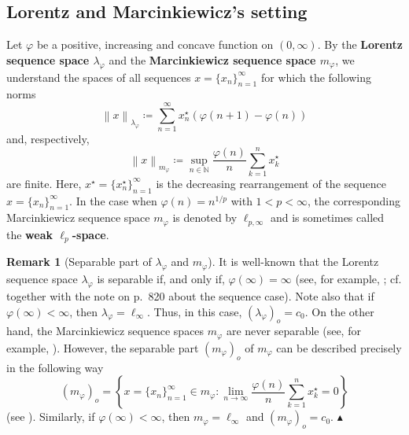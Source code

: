 \documentclass[11pt]{amsart}
\theoremstyle{definition}
\theoremstyle{definition}
\theoremstyle{definition}
\theoremstyle{definition}
\theoremstyle{definition}
\theoremstyle{definition}
\newtheorem{remark}[theorem]{Remark}
\theoremstyle{definition}
\theoremstyle{definition}
\numberwithin{equation}{section}
\numberwithin{equation}{section}
\numberwithin{equation}{section}
\theoremstyle{definition}
\theoremstyle{definition}
\theoremstyle{definition}
\theoremstyle{definition}
\theoremstyle{definition}
\theoremstyle{definition}
\newcommand{\norm}[1]{\left\lVert#1\right\rVert}
\newcommand\xqed[1]{%
	\leavevmode\unskip\penalty9999 \hbox{}\nobreak\hfill
	\quad\hbox{#1}}
\newcommand\demo{\xqed{{\Large $\blacktriangle$}}}
\begin{document}
\subsection{Lorentz and Marcinkiewicz's setting}
	Let $\varphi$ be a positive, increasing and concave function on $(0,\infty)$.
	By the {\bf Lorentz sequence space $\lambda_{\varphi}$} and the {\bf Marcinkiewicz sequence space $m_{\varphi}$},
	we understand the spaces of all sequences $x = \{x_n\}_{n=1}^{\infty}$ for which the following norms
	\begin{equation*}
		\norm{x}_{\lambda_{\varphi}} \coloneqq \sum_{n=1}^{\infty} x_n^{\star} (\varphi(n+1) - \varphi(n))
	\end{equation*}
	and, respectively,
	\begin{equation*}
		\norm{x}_{m_{\varphi}} \coloneqq \sup\limits_{n \in \mathbb{N}} \frac{\varphi(n)}{n} \sum_{k=1}^n x_k^{\star}
	\end{equation*}
	are finite. Here, $x^{\star} = \{x_n^{\star}\}_{n=1}^{\infty}$ is the decreasing rearrangement of the sequence $x = \{x_n\}_{n=1}^{\infty}$.
	In the case when $\varphi(n) = n^{1/p}$ with $1 < p < \infty$, the corresponding Marcinkiewicz sequence space $m_{\varphi}$
	is denoted by $\ell_{p,\infty}$ and is sometimes called the {\bf weak $\ell_p$-space}.
	
	\begin{remark}[Separable part of $\lambda_{\varphi}$ and $m_{\varphi}$] \label{REMARK: separable part lorentz marcinkiewicz}
		It is well-known that the Lorentz sequence space $\lambda_{\varphi}$ is separable if, and only if, $\varphi(\infty) = \infty$
		(see, for example, \cite[Lemma~5.1, p.~110]{KPS82}; cf. \cite[Corollary~4.20]{Kol16} together with the note on p.~820 about the sequence case).
		Note also that if $\varphi(\infty) < \infty$, then $\lambda_{\varphi} = \ell_{\infty}$. Thus, in this case, $(\lambda_{\varphi})_o = c_0$.
		On the other hand, the Marcinkiewicz sequence spaces $m_{\varphi}$ are never separable (see, for example, \cite[Remark~4.4(ii)]{Kol16}).
		However, the separable part $(m_{\varphi})_o$ of $m_{\varphi}$ can be described precisely in the following way
		\begin{equation*}
			(m_{\varphi})_o = \left\{ x = \{x_n\}_{n=1}^{\infty} \in m_{\varphi} \colon \lim\limits_{n \rightarrow \infty} \frac{\varphi(n)}{n} \sum_{k=1}^n x_k^{\star} = 0 \right\}
		\end{equation*}
		(see \cite[pp.~115--116]{KPS82}). Similarly, if $\varphi(\infty) < \infty$, then $m_{\varphi} = \ell_{\infty}$ and $(m_{\varphi})_o = c_0$.
		\demo
	\end{remark}
\end{document}
